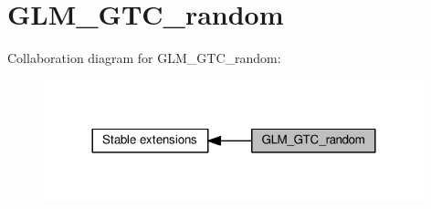\hypertarget{group__gtc__random}{}\section{G\+L\+M\+\_\+\+G\+T\+C\+\_\+random}
\label{group__gtc__random}
Collaboration diagram for G\+L\+M\+\_\+\+G\+T\+C\+\_\+random\+:
\nopagebreak
\begin{figure}[H]
\begin{center}
\leavevmode
\includegraphics[width=312pt]{de/d0b/group__gtc__random}
\end{center}
\end{figure}
